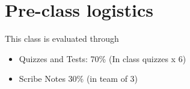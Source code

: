 \documentclass{article}
\theoremstyle{definition}
\theoremstyle{remark}
\begin{document}

\section{Pre-class logistics}
This class is evaluated through
\begin{itemize}
\item Quizzes and Tests: 70\% (In class quizzes x 6)
\item Scribe Notes 30\%  (in team of 3)
\end{itemize}
\end{document}
